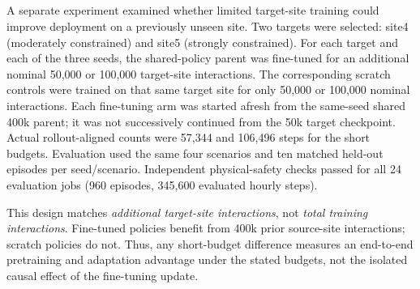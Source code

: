 \subsection[Target-Site Adaptation Versus Training from Scratch]
{}
\label{sec:g5b_adaptation}
\begin{revisedblock}
A separate experiment examined whether limited target-site training
could improve deployment on a previously unseen site. Two targets
were selected: site4 (moderately constrained) and site5 (strongly
constrained). For each target and each of the three seeds, the
shared-policy parent was fine-tuned for an additional nominal
50,000 or 100,000 target-site interactions. The corresponding
scratch controls were trained on that same target site for only
50,000 or 100,000 nominal interactions. Each fine-tuning arm was
started afresh from the same-seed shared 400k parent; it was not
successively continued from the 50k target checkpoint. Actual
rollout-aligned counts were 57,344 and 106,496 steps for the short
budgets. Evaluation used the same four scenarios and ten matched
held-out episodes per seed/scenario. Independent physical-safety checks passed for all 24 evaluation jobs (960 episodes, 345,600 evaluated hourly steps).

This design matches \emph{additional target-site interactions}, not
\emph{total training interactions}. Fine-tuned policies benefit from
400k prior source-site interactions; scratch policies do not. Thus,
any short-budget difference measures an end-to-end pretraining and
adaptation advantage under the stated budgets, not the isolated causal
effect of the fine-tuning update.
\end{revisedblock}

